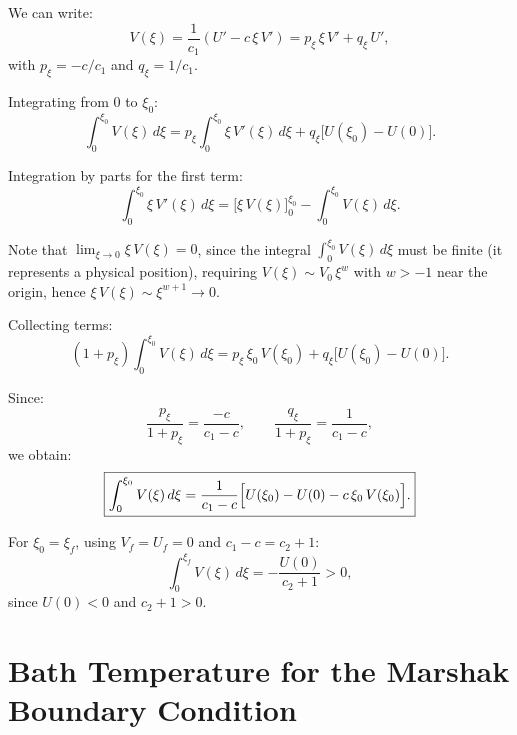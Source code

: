 \documentclass[11pt]{article}
\begin{document}
We can write:
\begin{equation}
  V(\xi) = \frac{1}{c_1}\!\left(U' - c\,\xi\,V'\right)
  = p_\xi\,\xi\,V' + q_\xi\,U',
\end{equation}
with $p_\xi = -c/c_1$ and $q_\xi = 1/c_1$.

Integrating from $0$ to $\xi_0$:
\begin{equation}
  \int_0^{\xi_0} V(\xi)\,d\xi
  = p_\xi \int_0^{\xi_0} \xi\,V'(\xi)\,d\xi
  + q_\xi\bigl[U(\xi_0) - U(0)\bigr].
\end{equation}

Integration by parts for the first term:
\begin{equation}
  \int_0^{\xi_0} \xi\,V'(\xi)\,d\xi
  = \bigl[\xi\,V(\xi)\bigr]_0^{\xi_0}
  - \int_0^{\xi_0} V(\xi)\,d\xi.
\end{equation}

Note that $\lim_{\xi\to 0}\xi\,V(\xi) = 0$, since the integral $\int_0^{\xi_0}V(\xi)\,d\xi$ must be finite (it represents a physical position), requiring $V(\xi) \sim V_0\,\xi^{w}$ with $w > -1$ near the origin, hence $\xi\,V(\xi) \sim \xi^{w+1} \to 0$.

Collecting terms:
\begin{equation}
  (1 + p_\xi)\int_0^{\xi_0} V(\xi)\,d\xi
  = p_\xi\,\xi_0\,V(\xi_0) + q_\xi\bigl[U(\xi_0) - U(0)\bigr].
\end{equation}

Since:
\begin{equation}
  \frac{p_\xi}{1+p_\xi} = \frac{-c}{c_1 - c}, \qquad
  \frac{q_\xi}{1+p_\xi} = \frac{1}{c_1 - c},
\end{equation}
we obtain:
\begin{equation}
  \boxed{
  \int_0^{\xi_0} V(\xi)\,d\xi
  = \frac{1}{c_1 - c}
    \Bigl[U(\xi_0) - U(0) - c\,\xi_0\,V(\xi_0)\Bigr].}
  \label{eq:V_integral_identity_proof}
\end{equation}

For $\xi_0 = \xi_f$, using $V_f = U_f = 0$ and $c_1 - c = c_2 + 1$:
\begin{equation}
  \int_0^{\xi_f} V(\xi)\,d\xi = -\frac{U(0)}{c_2 + 1} > 0,
\end{equation}
since $U(0) < 0$ and $c_2 + 1 > 0$.

\section{Bath Temperature for the Marshak Boundary Condition}
\label{sec:bath_temp}
\end{document}
